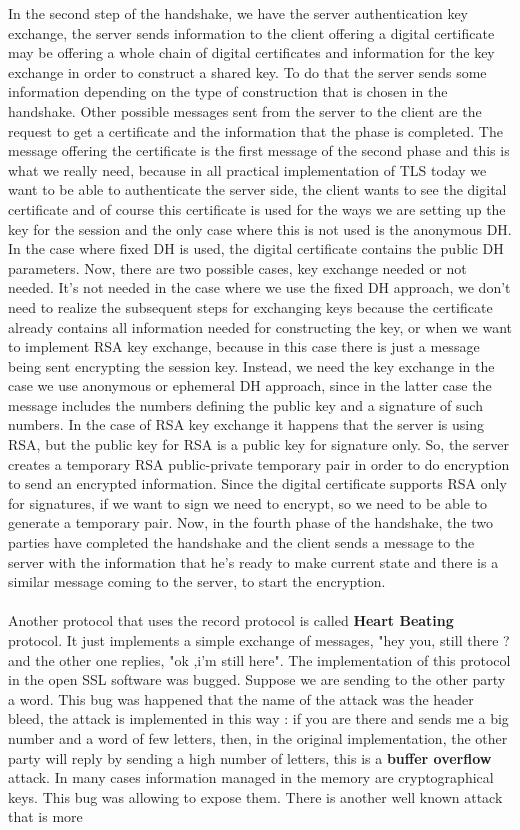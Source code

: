 \documentclass[11pt]{article}
\begin{document}
In the second step of the handshake, we have the server authentication key exchange, the server sends information to the client offering a digital certificate may be offering a whole chain of digital certificates and information for the key exchange in order to construct a shared key. To do that the server sends some information depending on the type of construction that is chosen in the handshake. Other possible messages sent from the server to the client are the request to get a certificate and the information that the phase is completed. The message offering the certificate is the first message of the second phase and this is what we really need, because in all practical implementation of TLS today we want to be able to authenticate the server side, the client wants to see the digital certificate and of course this certificate is used for the ways we are setting up the key for the session and the only case where this is not used is the anonymous DH. In the case where fixed DH is used, the digital certificate contains the public DH parameters. Now, there are two possible cases, key exchange needed or not needed. It's not needed in the case where we use the fixed DH approach, we don't need to realize the subsequent steps for exchanging keys because the certificate already contains all information needed for constructing the key, or when we want to implement RSA key exchange, because in this case there is just a message being sent encrypting the session key. Instead, we need the key exchange in the case we use anonymous or ephemeral DH approach, since in the latter case the message includes the numbers defining the public key and a signature of such numbers. In the case of RSA key exchange it happens that the server is using RSA, but the public key for RSA is a public key for signature only. So, the server creates a temporary RSA public-private temporary pair in order to do encryption to send an encrypted information. Since the digital certificate supports RSA only for signatures, if we want to sign we need to encrypt, so we need to be able to generate a temporary pair. Now, in the fourth phase of the handshake, the two parties have completed the handshake and the client sends a message to the server with the information that he's ready to make current state and there is a similar message coming to the server, to start the encryption. \\\\Another protocol that uses the record protocol is called \textbf{Heart Beating} protocol. It just implements a simple exchange of messages, "hey you, still there ? and the other one replies, "ok ,i'm still here". The implementation of this protocol in the open SSL software was bugged. Suppose we are sending to the other party a word. This bug was happened that the name of the attack was the header bleed, the attack is implemented in this way : if you are there and sends me a big number and a word of few letters, then, in the original implementation, the other party will reply by sending a high number of letters, this is a \textbf{buffer overflow} attack. In many cases information managed in the memory are cryptographical keys. This bug was allowing to expose them. There is another well known attack that is more 
\end{document}
